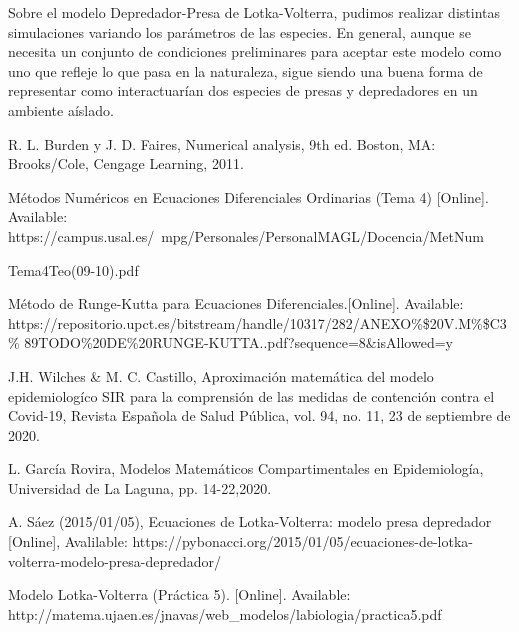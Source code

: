 \documentclass[a4paper,12pt]{article}
\begin{document}
Sobre el modelo Depredador-Presa de Lotka-Volterra, pudimos realizar distintas simulaciones variando los parámetros de las especies. En general, aunque se necesita un conjunto de condiciones preliminares para aceptar este modelo como uno que refleje lo que pasa en la naturaleza, sigue siendo una buena forma de representar como interactuarían dos especies de presas y depredadores en un ambiente aíslado. \par

\newpage





\begin{thebibliography}{00}
 R. L. Burden y J. D. Faires, Numerical analysis, 9th ed. Boston, MA: Brooks/Cole, Cengage Learning, 2011.

 Métodos Numéricos en Ecuaciones Diferenciales Ordinarias (Tema 4) [Online]. Available: https://campus.usal.es/~mpg/Personales/PersonalMAGL/Docencia/MetNum

Tema4Teo(09-10).pdf

 Método de Runge-Kutta para Ecuaciones Diferenciales.[Online]. Available: https://repositorio.upct.es/bitstream/handle/10317/282/ANEXO\%\$20V.M\%\$C3\%
89TODO\%20DE\%20RUNGE-KUTTA..pdf?sequence=8\&isAllowed=y

 J.H. Wilches \& M. C. Castillo, Aproximación matemática del modelo epidemiologíco SIR para la comprensión de las medidas de contención contra el Covid-19, Revista Española de Salud Pública, vol. 94, no. 11, 23 de septiembre de 2020.

 L. García Rovira, Modelos Matemáticos Compartimentales en Epidemiología, Universidad de La Laguna, pp. 14-22,2020.

 A. Sáez (2015/01/05), Ecuaciones de Lotka-Volterra: modelo presa depredador [Online], Avalilable: https://pybonacci.org/2015/01/05/ecuaciones-de-lotka-volterra-modelo-presa-depredador/

 Modelo Lotka-Volterra (Práctica 5). [Online]. Available: http://matema.ujaen.es/jnavas/web\_modelos/labiologia/practica5.pdf
\end{thebibliography}
\end{document}
